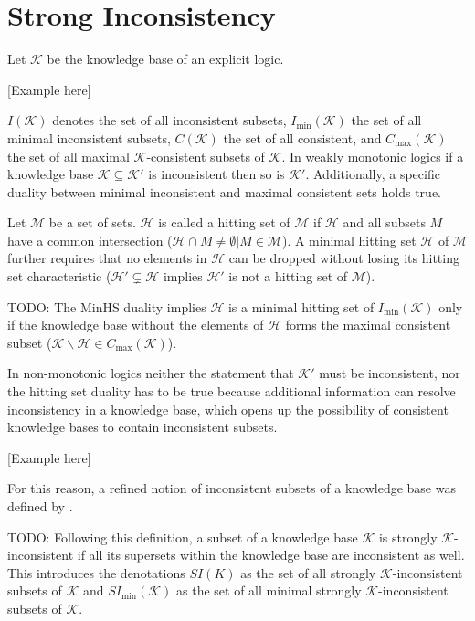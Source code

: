\section{Strong Inconsistency}
Let \(\mathcal{K}\) be the knowledge base of an explicit logic.

    [Example here]

\(I(\mathcal{K})\) denotes the set of all inconsistent subsets, \(I_{\min}(\mathcal{K})\) the set of all minimal inconsistent subsets, \(C(\mathcal{K})\) the set of all consistent, and \(C_{\max}(\mathcal{K})\) the set of all maximal \(\mathcal{K}\)-consistent subsets of \(\mathcal{K}\). In weakly monotonic logics if a knowledge base \(\mathcal{K} \subseteq \mathcal{K}'\) is inconsistent then so is \(\mathcal{K}'\). Additionally, a specific duality between minimal inconsistent and maximal consistent sets holds true.

Let \(\mathcal{M}\) be a set of sets. \(\mathcal{H}\) is called a hitting set of \(\mathcal{M}\) if \(\mathcal{H}\) and all subsets \(M\) have a common intersection (\(\mathcal{H} \cap M \neq \emptyset | M \in \mathcal{M}\)). A minimal hitting set \(\mathcal{H}\) of \(\mathcal{M}\) further requires that no elements in \(\mathcal{H}\) can be dropped without losing its hitting set characteristic (\(\mathcal{H}' \subsetneq \mathcal{H}\) implies \(\mathcal{H}'\) is not a hitting set of \(\mathcal{M}\)).

\begin{theorem}
    TODO:
    The MinHS duality \cite{reiter_theory_1987} implies \(\mathcal{H}\) is a minimal hitting set of \(I_{\min}(\mathcal{K})\) only if the knowledge base without the elements of \(\mathcal{H}\) forms the maximal consistent subset (\(\mathcal{K} \backslash \mathcal{H} \in C_{\max}(\mathcal{K})\)).
\end{theorem}

In non-monotonic logics neither the statement that \(\mathcal{K}'\) must be inconsistent, nor the hitting set duality has to be true because additional information can resolve inconsistency in a knowledge base, which opens up the possibility of consistent knowledge bases to contain inconsistent subsets.

    [Example here]

For this reason, a refined notion of inconsistent subsets of a knowledge base was defined by \cite{brewka_strong_2017}.
\begin{definition}
    TODO:
    Following this definition, a subset of a knowledge base \(\mathcal{K}\) is strongly \(\mathcal{K}\)-inconsistent if all its supersets within the knowledge base are inconsistent as well. This introduces the denotations \(SI(K)\) as the set of all strongly \(\mathcal{K}\)-inconsistent subsets of \(\mathcal{K}\) and \(SI_{\min}(\mathcal{K})\) as the set of all minimal strongly \(\mathcal{K}\)-inconsistent subsets of \(\mathcal{K}\).
\end{definition}

